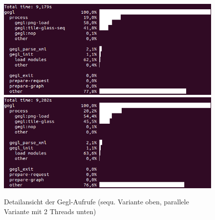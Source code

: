 \begin{figure}[h]
\begin{center}
\includegraphics[width=1.0\textwidth]{gtile_seq_dia.png}
\includegraphics[width=1.0\textwidth]{gtile_par_dia.png}
\end{center}
\caption{Detailansicht der Gegl-Aufrufe (sequ. Variante oben, parallele Variante mit 2 Threads unten)}\label{fig:gtile-dias}
\end{figure}
